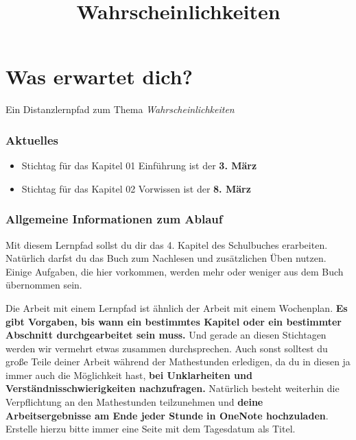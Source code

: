 \documentclass[
  ngerman,
]{book}
\title{Wahrscheinlichkeiten}
\author{}
\date{\vspace{-2.5em}}
\begin{document}
\maketitle

{
\setcounter{tocdepth}{1}
\tableofcontents
}
\hypertarget{was-erwartet-dich}{%
\chapter*{Was erwartet dich?}\label{was-erwartet-dich}}

Ein Distanzlernpfad zum Thema \emph{Wahrscheinlichkeiten}

\hypertarget{aktuelles}{%
\subsection*{Aktuelles}\label{aktuelles}}

\begin{itemize}
\item
  Stichtag für das Kapitel 01 Einführung ist der \textbf{3. März}
\item
  Stichtag für das Kapitel 02 Vorwissen ist der \textbf{8. März}
\end{itemize}

\hypertarget{allgemeine-informationen-zum-ablauf}{%
\subsection*{Allgemeine Informationen zum Ablauf}\label{allgemeine-informationen-zum-ablauf}}

Mit diesem Lernpfad sollst du dir das 4. Kapitel des Schulbuches erarbeiten. Natürlich darfst du das Buch zum Nachlesen und zusätzlichen Üben nutzen. Einige Aufgaben, die hier vorkommen, werden mehr oder weniger aus dem Buch übernommen sein.

Die Arbeit mit einem Lernpfad ist ähnlich der Arbeit mit einem Wochenplan. \textbf{Es gibt Vorgaben, bis wann ein bestimmtes Kapitel oder ein bestimmter Abschnitt durchgearbeitet sein muss.} Und gerade an diesen Stichtagen werden wir vermehrt etwas zusammen durchsprechen. Auch sonst solltest du große Teile deiner Arbeit während der Mathestunden erledigen, da du in diesen ja immer auch die Möglichkeit hast, \textbf{bei Unklarheiten und Verständnisschwierigkeiten nachzufragen.} Natürlich besteht weiterhin die Verpflichtung an den Mathestunden teilzunehmen und \textbf{deine Arbeitsergebnisse am Ende jeder Stunde in OneNote hochzuladen}. Erstelle hierzu bitte immer eine Seite mit dem Tagesdatum als Titel.
\end{document}

